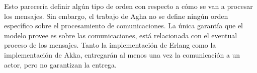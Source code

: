 Esto parecería definir algún tipo de orden con respecto a cómo se van a procesar los mensajes. Sin embargo, el trabajo de Agha\cite{Agha:1986:AMC:7929} no se define ningún orden específico sobre el procesamiento de comunicaciones. La única garantía que el modelo provee es sobre las comunicaciones, está relacionada con el eventual proceso de los mensajes. Tanto la implementación de Erlang\cite{Cesarini:2009:EP:1717841} como la implementación de Akka\cite{Wyatt:2013:AC:2663429}, entregarán al menos una vez la comunicación a un actor, pero no garantizan la entrega.


